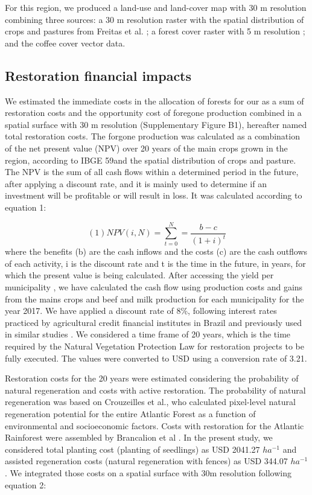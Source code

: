 \documentclass[
	12pt,				%
	oneside,			%
	a4paper,			%
	chapter=TITLE,		%
	section=TITLE,		%
	brazil,			%
	english				%
	]{abntex2}
\begin{document}
For this region, we produced a land-use and land-cover map with 30 m resolution combining three sources: a 30 m resolution raster with the spatial distribution of crops and pastures from Freitas et al. \autocite{freitas_potential_2018}; a forest cover raster with 5 m resolution \autocite{fbds_fundacao_2013}; and the coffee cover vector data.

\hypertarget{restoration-financial-impacts}{%
\subsection{Restoration financial impacts}\label{restoration-financial-impacts}}

We estimated the immediate costs in the allocation of forests for our as a sum of restoration costs and the opportunity cost of foregone production combined in a spatial surface with 30 m resolution (Supplementary Figure B1), hereafter named total restoration costs. The forgone production was calculated as a combination of the net present value (NPV) over 20 years of the main crops grown in the region, according to IBGE 59and the spatial distribution of crops and pasture. The NPV is the sum of all cash flows within a determined period in the future, after applying a discount rate, and it is mainly used to determine if an investment will be profitable or will result in loss. It was calculated according to equation 1:

\[ (1) NPV (i,N) = \sum_{t=0}^{N}=  \frac{b-c}{(1+i)^t} \]
where the benefits (b) are the cash inflows and the costs (c) are the cash outflows of each activity, i is the discount rate and t is the time in the future, in years, for which the present value is being calculated. After accessing the yield per municipality \autocite{ibge_producao_2017}, we have calculated the cash flow using production costs and gains from the mains crops \autocite{conab_companhia_2017} and beef and milk production \autocite{cepea_centro_2017} for each municipality for the year 2017. We have applied a discount rate of 8\%, following interest rates practiced by agricultural credit financial institutes in Brazil and previously used in similar studies \autocite{niemeyer_planning_2019}. We considered a time frame of 20 years, which is the time required by the Natural Vegetation Protection Law for restoration projects to be fully executed. The values were converted to USD using a conversion rate of 3.21.

Restoration costs for the 20 years were estimated considering the probability of natural regeneration and costs with active restoration. The probability of natural regeneration was based on Crouzeilles et al.\autocite*{crouzeilles_achieving_2019}, who calculated pixel-level natural regeneration potential for the entire Atlantic Forest as a function of environmental and socioeconomic factors. Costs with restoration for the Atlantic Rainforest were assembled by Brancalion et al \autocite{brancalion_what_2019}. In the present study, we considered total planting cost (planting of seedlings) as USD 2041.27 \(ha^{ -1}\) and assisted regeneration costs (natural regeneration with fences) as USD 344.07 \(ha^{-1}\). We integrated those costs on a spatial surface with 30m resolution following equation 2:
\end{document}
